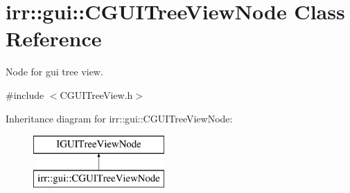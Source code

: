 \hypertarget{classirr_1_1gui_1_1_c_g_u_i_tree_view_node}{\section{irr\-:\-:gui\-:\-:C\-G\-U\-I\-Tree\-View\-Node Class Reference}
\label{classirr_1_1gui_1_1_c_g_u_i_tree_view_node}
}


Node for gui tree view.  




{\ttfamily \#include $<$C\-G\-U\-I\-Tree\-View.\-h$>$}

Inheritance diagram for irr\-:\-:gui\-:\-:C\-G\-U\-I\-Tree\-View\-Node\-:\begin{figure}[H]
\begin{center}
\leavevmode
\includegraphics[height=2.000000cm]{classirr_1_1gui_1_1_c_g_u_i_tree_view_node}
\end{center}
\end{figure}

